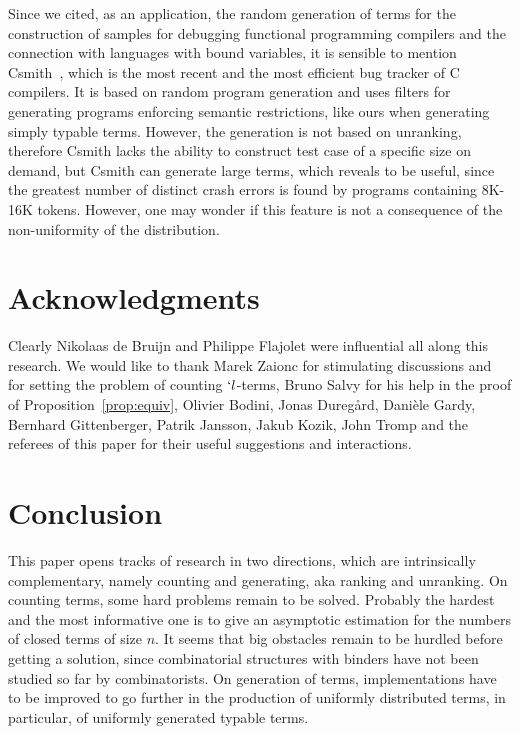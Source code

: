 \documentclass{jfp1}
\begin{document}
  Since we cited, as an application, the random generation of terms for the
  construction of samples for debugging functional programming compilers and the
  connection with languages with bound variables, it is sensible to mention
  \textsf{Csmith}~\cite{DBLP:conf/pldi/YangCER11}, which is the most recent and the
  most efficient bug tracker of C compilers.  It is based on random program
  generation and uses filters for generating programs enforcing semantic
  restrictions, like ours when generating simply typable terms.  However, the generation
  is not based on unranking, therefore \textsf{Csmith} lacks the ability to construct
  test case of a specific size on demand, but \textsf{Csmith} can generate large
  terms, which reveals to be useful, since the greatest number of distinct crash
  errors is found by programs containing 8K-16K tokens. However, one may wonder if
  this feature is not a consequence of the non-uniformity of the distribution.

\section{Acknowledgments}
\label{sec:acknowledgments}

Clearly Nikolaas de Bruijn and  Philippe Flajolet were influential all along this research.  We would like to
thank Marek Zaionc for stimulating discussions and for setting the problem of
counting $`l$-terms, Bruno Salvy for his help in the proof of
Proposition~\ref{prop:equiv}, Olivier Bodini, Jonas Dureg{\aa}rd, Dani\`{e}le Gardy,
Bernhard Gittenberger, Patrik Jansson, Jakub Kozik, John Tromp and the referees of this paper for
their useful suggestions and interactions.

\section{Conclusion}
\label{sec:conclusion}

This paper opens tracks of research in two directions, which are intrinsically
complementary, namely counting and generating, aka ranking and unranking. On counting terms, some hard problems
remain to be solved.  Probably the hardest and the most informative one is to
give an asymptotic estimation for the numbers of closed terms of size $n$. It seems that big
obstacles remain to be hurdled before getting a solution, since combinatorial
structures with binders have not been studied so far by combinatorists.  On generation of
terms, implementations have to be improved to go further in the production of
uniformly distributed terms, in particular, of uniformly generated typable terms.  
\end{document}
